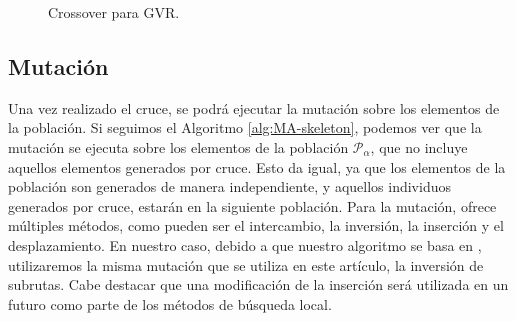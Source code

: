 \begin{figure}[t]
{
    }%
    \caption{Crossover para GVR.}
    \label{fig:crossoverGVR}
\end{figure}

\subsection{Mutación}
Una vez realizado el cruce, se podrá ejecutar la mutación sobre los elementos de la población. Si seguimos el Algoritmo \ref{alg:MA-skeleton}, podemos ver que la mutación se ejecuta sobre los elementos de la población $\mathscr{P}_\alpha$, que no incluye aquellos elementos generados por cruce. Esto da igual, ya que los elementos de la población son generados de manera independiente, y aquellos individuos generados por cruce, estarán en la siguiente población. Para la mutación, \cite{gvr} ofrece múltiples métodos, como pueden ser el intercambio, la inversión, la inserción y el desplazamiento. En nuestro caso, debido a que nuestro algoritmo se basa en \cite{MC-VRP-Stochastic-Mendoza}, utilizaremos la misma mutación que se utiliza en este artículo, la inversión de subrutas. Cabe destacar que una modificación de la inserción será utilizada en un futuro como parte de los métodos de búsqueda local.\\

